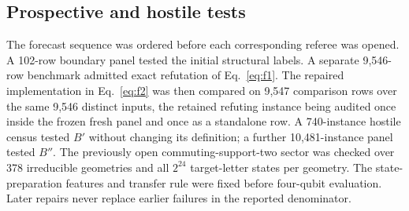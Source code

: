 \subsection{Prospective and hostile tests}

The forecast sequence was ordered before each corresponding referee was opened.  A 102-row boundary panel tested the initial structural labels.  A separate 9,546-row benchmark admitted exact refutation of Eq.~\eqref{eq:f1}.  The repaired implementation in Eq.~\eqref{eq:f2} was then compared on 9,547 comparison rows over the same 9,546 distinct inputs, the retained refuting instance being audited once inside the frozen fresh panel and once as a standalone row.  A 740-instance hostile census tested $B'$ without changing its definition; a further 10,481-instance panel tested $B''$.  The previously open commuting-support-two sector was checked over 378 irreducible geometries and all $2^{24}$ target-letter states per geometry.  The state-preparation features and transfer rule were fixed before four-qubit evaluation.  Later repairs never replace earlier failures in the reported denominator.
